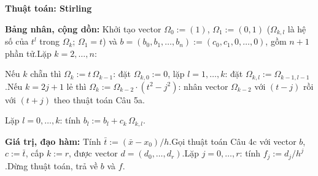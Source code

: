 \documentclass[11pt,a4paper]{article}
\newenvironment{thuattoan}[1]
  {\par\medskip\noindent\textbf{Thuật toán: #1}\begin{description}[style=standard,align=left,leftmargin=4.3em,labelwidth=3.9em,labelsep=0.4em,itemsep=1pt,topsep=3pt,font=\normalfont\bfseries]}
  {\end{description}}
\newenvironment{con}
  {\begin{description}[style=standard,align=left,leftmargin=2.1em,labelwidth=1.8em,labelsep=0.3em,itemsep=0pt,topsep=1pt,font=\normalfont]}
  {\end{description}}
\begin{document}
\begin{thuattoan}{Stirling}
\item[Bước 4:] \textbf{Bảng nhân, cộng dồn:} Khởi tạo vector $\Omega_0:=(1)$, $\Omega_1:=(0,1)$ ($\Omega_{k,l}$ là hệ số của $t^l$ trong $\Omega_k$; $\Omega_1=t$) và $b=(b_0,b_1,\dots,b_n):=(c_0,c_1,0,\dots,0)$, gồm $n+1$ phần tử.\newline Lặp $k=2,\dots,n$:
  \begin{con}
  \item[4.1:] Nếu $k$ chẵn thì $\Omega_k:=t\,\Omega_{k-1}$: đặt $\Omega_{k,0}:=0$, lặp $l=1,\dots,k$: đặt $\Omega_{k,l}:=\Omega_{k-1,l-1}$.\newline Nếu $k=2j+1$ lẻ thì $\Omega_k:=\Omega_{k-2}\cdot(t^2-j^2)$: nhân vector $\Omega_{k-2}$ với $(t-j)$ rồi với $(t+j)$ theo thuật toán Câu 5a.
  \item[4.2:] Lặp $l=0,\dots,k$: tính $b_l:=b_l+c_k\,\Omega_{k,l}$.
  \end{con}
\item[Bước 5:] \textbf{Giá trị, đạo hàm:} Tính $\bar t:=(\bar x-x_0)/h$.\newline Gọi thuật toán Câu 4c với vector $b$, $c:=\bar t$, cấp $k:=r$, được vector $d=(d_0,\dots,d_r)$.\newline Lặp $j=0,\dots,r$: tính $f_j:=d_j/h^j$.\newline Dừng thuật toán, trả về $b$ và $f$.
\end{thuattoan}
\end{document}

